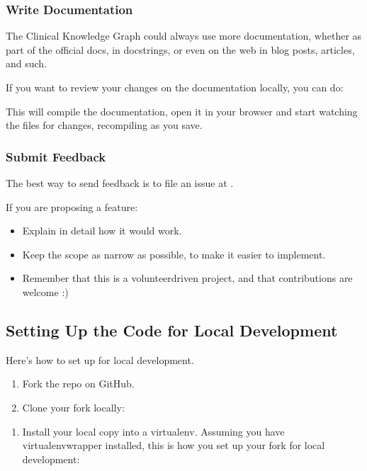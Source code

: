 \documentclass[letterpaper,10pt,english]{sphinxmanual}
\begin{document}
\subsubsection{Write Documentation}
\label{\detokenize{MANIFEST:write-documentation}}
The Clinical Knowledge Graph could always use more documentation, whether as part of the official docs, in docstrings, or even on the web in blog posts, articles, and such.

If you want to review your changes on the documentation locally, you can do:

This will compile the documentation, open it in your browser and start watching the files for changes, recompiling as you save.


\subsubsection{Submit Feedback}
\label{\detokenize{MANIFEST:submit-feedback}}
The best way to send feedback is to file an issue at .

If you are proposing a feature:
\begin{itemize}
\item {} 
Explain in detail how it would work.

\item {} 
Keep the scope as narrow as possible, to make it easier to implement.

\item {} 
Remember that this is a volunteer\sphinxhyphen{}driven project, and that contributions are welcome :)

\end{itemize}


\subsection{Setting Up the Code for Local Development}
\label{\detokenize{MANIFEST:setting-up-the-code-for-local-development}}
Here’s how to set up  for local development.
\begin{enumerate}
%
\item {} 
Fork the  repo on GitHub.

\item {} 
Clone your fork locally:

\end{enumerate}
\begin{enumerate}
%
\setcounter{enumi}{2}
\item {} 
Install your local copy into a virtualenv. Assuming you have virtualenvwrapper installed, this is how you set up your fork for local development:

\end{enumerate}
\end{document}
